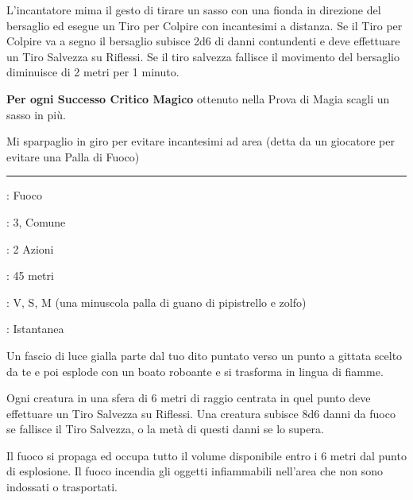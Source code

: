 \begin{multicols}{2}
L'incantatore mima il gesto di tirare un sasso con una fionda in direzione del bersaglio ed esegue un Tiro per Colpire con incantesimi a distanza.
Se il Tiro per Colpire va a segno il bersaglio subisce 2d6 di danni contundenti e deve effettuare un Tiro Salvezza su Riflessi. Se il tiro salvezza fallisce il movimento del bersaglio diminuisce di 2 metri per 1 minuto.

\textbf{Per ogni Successo Critico Magico} ottenuto nella Prova di Magia scagli un sasso in più.

\begin{changemargin}{0.3cm}{0.3cm}\begin{enfasi}{
			Mi sparpaglio in giro per evitare incantesimi ad area (detta da un giocatore per evitare una Palla di Fuoco)
}\end{enfasi}\end{changemargin}

\smallskip\noindent\rule{\linewidth}{2pt} \hypertarget{Palla di Fuoco}{}\medskip{}
\noindent
\begin{description}[noitemsep, topsep=0pt, parsep=0pt, partopsep=0pt, leftmargin=0cm, labelwidth=2.8cm]
	\item[\textbf{Lista di Magia}]: Fuoco
	\item[\textbf{Livello}]: 3, Comune
	\item[\textbf{T. di Lancio}]: 2 Azioni
	\item[\textbf{Gittata}]: 45 metri
	\item[\textbf{Componenti}]: V, S, M (una minuscola palla di guano di pipistrello e zolfo)
	\item[\textbf{Durata}]: Istantanea
\end{description}

Un fascio di luce gialla parte dal tuo dito puntato verso un punto a gittata scelto da te e poi esplode con un boato roboante e si trasforma in lingua di fiamme.

Ogni creatura in una sfera di 6 metri di raggio centrata in quel punto deve effettuare un Tiro Salvezza su Riflessi. Una creatura subisce 8d6 danni da fuoco se fallisce il Tiro Salvezza, o la metà di questi danni se lo supera.

Il fuoco si propaga ed occupa tutto il volume disponibile entro i 6 metri dal punto di esplosione. Il fuoco incendia gli oggetti infiammabili nell'area che non sono indossati o trasportati.


\end{multicols}
